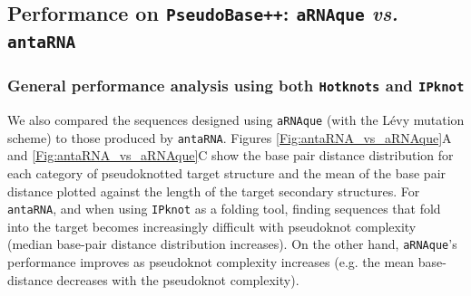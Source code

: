\subsection{Performance on \texttt{PseudoBase++}: \texttt{aRNAque} \emph{vs.} \texttt{antaRNA}}
\subsubsection{General performance analysis using both \texttt{Hotknots} and \texttt{IPknot}}
We also compared the sequences designed using \texttt{aRNAque} (with the Lévy mutation scheme) to those produced by \texttt{antaRNA}. Figures \ref{Fig:antaRNA_vs_aRNAque}A and \ref{Fig:antaRNA_vs_aRNAque}C show the base pair distance distribution for each category of pseudoknotted target structure and the mean of the base pair distance plotted against the length of the target secondary structures. For \texttt{antaRNA}, and when using \texttt{IPknot} as a folding tool, finding sequences that fold into the target becomes increasingly difficult with pseudoknot complexity (median base-pair distance distribution increases). On the other hand, \texttt{aRNAque}’s performance improves as pseudoknot complexity increases (e.g. the mean base-distance decreases with the pseudoknot complexity). 

